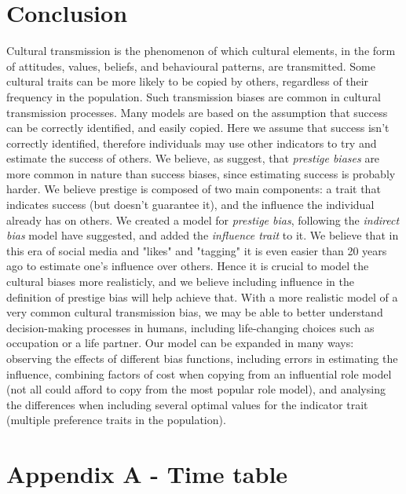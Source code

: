\documentclass[11pt]{article}
\begin{document}
\section*{Conclusion}
Cultural transmission is the phenomenon of which cultural elements, in the form of attitudes, values, beliefs, and behavioural patterns, are transmitted. %
Some cultural traits can be more likely to be copied by others, regardless of their frequency in the population.  %
Such transmission biases are common in cultural transmission processes. %
Many models are based on the assumption that success can be correctly identified, and easily copied. %
Here we assume that success isn't correctly identified, therefore individuals may use other indicators to try and estimate the success of others. %
We believe, as \citet{complexityPaper} suggest, that \textit{prestige biases} are more common in nature than success biases, since estimating success is probably harder. %
We believe prestige is composed of two main components: a trait that indicates success (but doesn't guarantee it), and the influence the individual already has on others. %
We created a model for \textit{prestige bias}, following the \textit{indirect bias} model \citet{evolutionBook} have suggested, and added the \textit{influence trait} to it. %
We believe that in this era of social media and "likes" and "tagging" it is even easier than 20 years ago to estimate one's influence over others. %
Hence it is crucial to model the cultural biases more realisticly, and we believe including influence in the definition of prestige bias will help achieve that.
With a more realistic model of a very common cultural transmission bias, we may be able to better understand decision-making processes in humans, including life-changing choices such as occupation or a life partner. 
Our model can be expanded in many ways: observing the effects of different bias functions, including errors in estimating the influence, combining factors of cost when copying from an influential role model (not all could afford to copy from the most popular role model), and analysing the differences when including several optimal values for the indicator trait (multiple preference traits in the population).

\clearpage
\section*{Appendix A - Time table}
\end{document}
